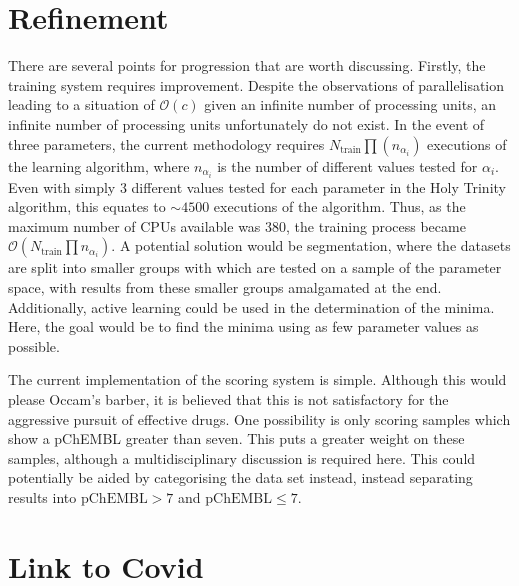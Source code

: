 \section{Refinement}
There are several points for progression that are worth discussing. Firstly, the training system requires improvement. Despite the observations of parallelisation leading to a situation of $\mathcal{O}(c)$ given an infinite number of processing units, an infinite number of processing units unfortunately do not exist. In the event of three parameters, the current methodology requires $N_\mathrm{train}\prod(n_{\alpha_i})$ executions of the learning algorithm, where $n_{\alpha_i}$ is the number of different values tested for $\alpha_i$. Even with simply 3 different values tested for each parameter in the Holy Trinity algorithm, this equates to $\sim{}4500$ executions of the algorithm. Thus, as the maximum number of CPUs available was 380, the training process became $\mathcal{O}\left(N_\mathrm{train}\prod{n_{\alpha_i}}\right)$. A potential solution would be segmentation, where the datasets are split into smaller groups with which are tested on a sample of the parameter space, with results from these smaller groups amalgamated at the end. Additionally, active learning could be used in the determination of the minima. Here, the goal would be to find the minima using as few parameter values as possible.

The current implementation of the scoring system is simple. Although this would please Occam's barber, it is believed that this is not satisfactory for the aggressive pursuit of effective drugs. One possibility is only scoring samples which show a pChEMBL greater than seven. This puts a greater weight on these samples, although a multidisciplinary discussion is required here. This could potentially be aided by categorising the data set instead, instead separating results into $\mathrm{pChEMBL}>7$ and $\mathrm{pChEMBL}\leq{}7$.

\section{Link to Covid}
\blindtext[1]

